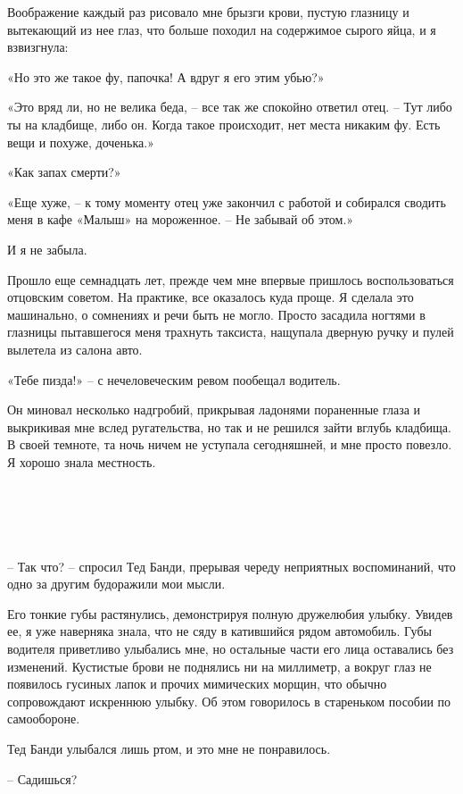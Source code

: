 \documentclass[
]{book}
\begin{document}
Воображение каждый раз рисовало мне брызги крови, пустую глазницу и вытекающий из нее глаз, что больше походил на содержимое сырого яйца, и я взвизгнула:

«Но это же такое фу, папочка! А вдруг я его этим убью?»

«Это вряд ли, но не велика беда, -- все так же спокойно ответил отец. -- Тут либо ты на кладбище, либо он. Когда такое происходит, нет места никаким фу. Есть вещи и похуже, доченька.»

«Как запах смерти?»

«Еще хуже, -- к тому моменту отец уже закончил с работой и собирался сводить меня в кафе «Малыш» на мороженное. -- Не забывай об этом.»

И я не забыла.

Прошло еще семнадцать лет, прежде чем мне впервые пришлось воспользоваться отцовским советом. На практике, все оказалось куда проще. Я сделала это машинально, о сомнениях и речи быть не могло. Просто засадила ногтями в глазницы пытавшегося меня трахнуть таксиста, нащупала дверную ручку и пулей вылетела из салона авто.

«Тебе пизда!» -- с нечеловеческим ревом пообещал водитель.

Он миновал несколько надгробий, прикрывая ладонями пораненные глаза и выкрикивая мне вслед ругательства, но так и не решился зайти вглубь кладбища. В своей темноте, та ночь ничем не уступала сегодняшней, и мне просто повезло. Я хорошо знала местность.

\hypertarget{chapter-70}{%
\chapter{~}\label{chapter-70}}

-- Так что? -- спросил Тед Банди, прерывая череду неприятных воспоминаний, что одно за другим будоражили мои мысли.

Его тонкие губы растянулись, демонстрируя полную дружелюбия улыбку. Увидев ее, я уже наверняка знала, что не сяду в катившийся рядом автомобиль. Губы водителя приветливо улыбались мне, но остальные части его лица оставались без изменений. Кустистые брови не поднялись ни на миллиметр, а вокруг глаз не появилось гусиных лапок и прочих мимических морщин, что обычно сопровождают искреннюю улыбку. Об этом говорилось в стареньком пособии по самообороне.

Тед Банди улыбался лишь ртом, и это мне не понравилось.

-- Садишься?
\end{document}
